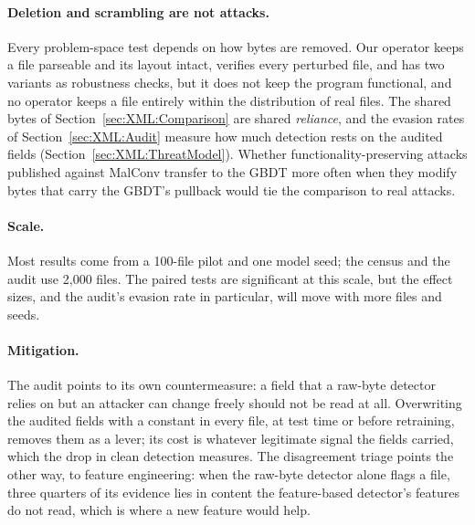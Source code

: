 \paragraph{Deletion and scrambling are not attacks.} Every problem-space test depends on how bytes are removed. Our
operator keeps a file parseable and its layout intact, verifies every perturbed file, and has two variants as
robustness checks, but it does not keep the program functional, and no operator keeps a file entirely within the
distribution of real files. The shared bytes of Section~\ref{sec:XML:Comparison} are shared \emph{reliance}, and the
evasion rates of Section~\ref{sec:XML:Audit} measure how much detection rests on the audited fields
(Section~\ref{sec:XML:ThreatModel}). Whether functionality-preserving attacks published against MalConv transfer to
the GBDT more often when they modify bytes that carry the GBDT's pullback would tie the comparison to real attacks.

\paragraph{Scale.} Most results come from a 100-file pilot and one model seed; the census and the audit use 2{,}000
files. %
The paired tests are significant at this scale, but the effect sizes, and the audit's evasion rate in particular, will
move with more files and seeds.

\paragraph{Mitigation.} The audit points to its own countermeasure: a field that a raw-byte detector relies on but an
attacker can change freely should not be read at all. Overwriting the audited fields with a constant in every file, at
test time or before retraining, removes them as a lever; its cost is whatever legitimate signal the fields carried,
which the drop in clean detection measures. The disagreement triage points the other way, to feature engineering:
when the raw-byte detector alone flags a file, three quarters of its evidence lies in content the feature-based
detector's features do not read, which is where a new feature would help.

